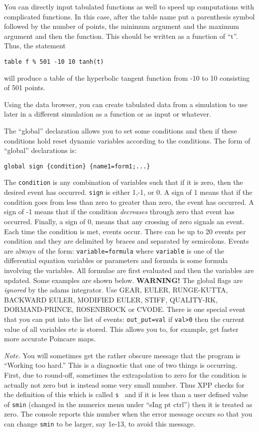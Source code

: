 \documentclass{article}
\newcommand{\bvb}{\begin{verbatim}}
\newcommand{\TCC}[1]{\medskip

\addcontentsline{toc}{subsubsection}{#1}
\noindent{\bf {#1}.}}
\begin{document}
You can directly
input tabulated functions as well to speed up computations with
complicated functions.  In this case, after the table name put a
parenthesis symbol followed by the number of points, the minimum
argument and the maximum argument and then the function.  This should
be written as a function of ``t''.  Thus, the statement
\begin{verbatim}
table f % 501 -10 10 tanh(t)
\end{verbatim}
will produce a table of the hyperbolic tangent function from -10 to 10
consisting of 501 points.  

Using the data browser, you can create tabulated data from a
simulation to use later in a different simulation as a function or as
input or whatever.

\TCC{Global Flags}
The ``global'' declaration allows you to set some conditions and then
if these conditions hold reset dynamic variables according to the
conditions.  The form of ``global'' declarations is:
\bvb
global sign {condition} {name1=form1;...}
\end{verbatim}
The {\tt condition} is any combination of variables such
that if it is zero, then the desired event has occurred. 
{\tt sign} is either 1,-1, or 0.  A sign of 1 means that if the
condition goes from less than zero to greater than zero, the event has
occurred. A sign of -1 means that if the condition {\em decreases}
through zero that event has occurred.  Finally, a sign of 0, means
that any crossing of zero signals an event.  Each time the condition
is met, events occur.  There can be up to 20 events per condition and
they are delimited by braces and separated by semicolons.  Events are
always of the form: {\tt variable=formula} where {\tt variable} is one
of the differential equation variables or parameters
and formula is some formula
involving the variables.  All formulae are first evaluated and then
the variables are updated.  Some examples are shown below.{\bf
WARNING!} The global flags are {\em ignored} by the adams
integrator.  Use GEAR, EULER, RUNGE-KUTTA, BACKWARD EULER, MODIFIED
EULER, STIFF, QUALITY-RK, DORMAND-PRINCE, ROSENBROCK or CVODE.
There is one special event that you can put into the list of
events: {\tt out\_put=val} if {\tt val>0} then the current value
of all variables etc is stored.  This allows you to, for example,
get faster more accurate Poincare maps.


{\em Note.} You will sometimes get the rather obscure message that the
program is ``Working too hard.''  This is a diagnostic that one of two
things is occurring.  First, due to round-off, sometimes the
extrapolation to zero for the condition is actually not zero but is
instead some very small number.  Thus XPP checks for the definition of
this which is called {\tt s } and if it is less than a user defined
value of {\tt smin} (changed in the numerics menu under ``sIng pt ctrl'')
then it is treated as zero.  The console reports this number when the
error message occurs so that you can change {\tt smin} to be larger,
say 1e-13, to avoid this message.  
\end{document}
